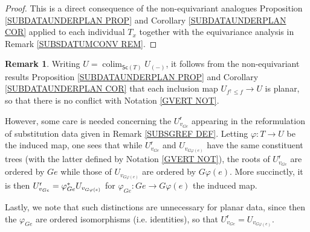 \documentclass[a4paper,10pt
,draft
]{article}%
\numberwithin{equation}{section}
\numberwithin{figure}{section}
\theoremstyle{definition} %
\newtheorem{remark}[equation]{Remark}%
\DeclareMathOperator{\colim}{colim}%
\newcommand{\1}{\ensuremath{\mathbbm 1}}%
\begin{document}
\begin{proof}
	This is a direct consequence of the 
	non-equivariant analogues Proposition \ref{SUBDATAUNDERPLAN PROP} and Corollary \ref{SUBDATAUNDERPLAN COR}
	applied to each individual $T_x$ together with the equivariance analysis in
	Remark \ref{SUBSDATUMCONV REM}.
\end{proof}


\begin{remark} \label{WHYR REM}
Writing $U = \colim_{\mathsf{Sc}(T)}U_{(\minus)}$, 
it follows from the non-equivariant results
Proposition \ref{SUBDATAUNDERPLAN PROP} and
Corollary \ref{SUBDATAUNDERPLAN COR}
that each inclusion map $U_{f^{\uparrow} \leq f} \to U$
is planar, so that there is no conflict with 
Notation \ref{GVERT NOT}.

However, some care is needed concerning the
$U_{v_{Ge}}^{\mathsf{r}}$ appearing in the reformulation of substitution data given in Remark \ref{SUBSGREF DEF}.
Letting $\varphi \colon T \to U$ be the induced map,
one sees that while $U_{v_{Ge}}^{\mathsf{r}}$ and 
$U_{v_{G\varphi(e)}}$
have the same constituent trees (with the latter defined by Notation \ref{GVERT NOT}),
the roots of $U_{v_{Ge}}^{\mathsf{r}}$ are ordered by $Ge$
while those of $U_{v_{G\varphi(e)}}$ are ordered by $G \varphi(e)$.
More succinctly, it is then 
$U_{v_{Ge}}^{\mathsf{r}} = \varphi_{Ge}^{\**}U_{v_{G\varphi(e)}}$ for $\varphi_{Ge} \colon Ge \to G \varphi(e)$
the induced map.

Lastly, we note that such distinctions are unnecessary for planar data, since then the $\varphi_{G e}$ are ordered isomorphisms (i.e. identities), so that 
$U_{v_{Ge}}^{\mathsf{r}} = U_{v_{G\varphi(e)}}$.
\end{remark}
\end{document}

